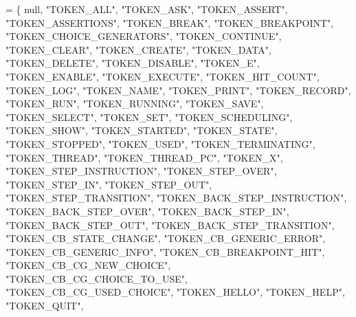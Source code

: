 \begin{DoxyCode}
= \{
    null, \textcolor{stringliteral}{"TOKEN\_ALL"}, \textcolor{stringliteral}{"TOKEN\_ASK"}, \textcolor{stringliteral}{"TOKEN\_ASSERT"}, \textcolor{stringliteral}{"TOKEN\_ASSERTIONS"}, \textcolor{stringliteral}{"TOKEN\_BREAK"}, 
    \textcolor{stringliteral}{"TOKEN\_BREAKPOINT"}, \textcolor{stringliteral}{"TOKEN\_CHOICE\_GENERATORS"}, \textcolor{stringliteral}{"TOKEN\_CONTINUE"}, \textcolor{stringliteral}{"TOKEN\_CLEAR"}, 
    \textcolor{stringliteral}{"TOKEN\_CREATE"}, \textcolor{stringliteral}{"TOKEN\_DATA"}, \textcolor{stringliteral}{"TOKEN\_DELETE"}, \textcolor{stringliteral}{"TOKEN\_DISABLE"}, \textcolor{stringliteral}{"TOKEN\_E"}, 
    \textcolor{stringliteral}{"TOKEN\_ENABLE"}, \textcolor{stringliteral}{"TOKEN\_EXECUTE"}, \textcolor{stringliteral}{"TOKEN\_HIT\_COUNT"}, \textcolor{stringliteral}{"TOKEN\_LOG"}, \textcolor{stringliteral}{"TOKEN\_NAME"}, 
    \textcolor{stringliteral}{"TOKEN\_PRINT"}, \textcolor{stringliteral}{"TOKEN\_RECORD"}, \textcolor{stringliteral}{"TOKEN\_RUN"}, \textcolor{stringliteral}{"TOKEN\_RUNNING"}, \textcolor{stringliteral}{"TOKEN\_SAVE"}, 
    \textcolor{stringliteral}{"TOKEN\_SELECT"}, \textcolor{stringliteral}{"TOKEN\_SET"}, \textcolor{stringliteral}{"TOKEN\_SCHEDULING"}, \textcolor{stringliteral}{"TOKEN\_SHOW"}, \textcolor{stringliteral}{"TOKEN\_STARTED"}, 
    \textcolor{stringliteral}{"TOKEN\_STATE"}, \textcolor{stringliteral}{"TOKEN\_STOPPED"}, \textcolor{stringliteral}{"TOKEN\_USED"}, \textcolor{stringliteral}{"TOKEN\_TERMINATING"}, \textcolor{stringliteral}{"TOKEN\_THREAD"}, 
    \textcolor{stringliteral}{"TOKEN\_THREAD\_PC"}, \textcolor{stringliteral}{"TOKEN\_X"}, \textcolor{stringliteral}{"TOKEN\_STEP\_INSTRUCTION"}, \textcolor{stringliteral}{"TOKEN\_STEP\_OVER"}, 
    \textcolor{stringliteral}{"TOKEN\_STEP\_IN"}, \textcolor{stringliteral}{"TOKEN\_STEP\_OUT"}, \textcolor{stringliteral}{"TOKEN\_STEP\_TRANSITION"}, \textcolor{stringliteral}{"TOKEN\_BACK\_STEP\_INSTRUCTION"}, 
    \textcolor{stringliteral}{"TOKEN\_BACK\_STEP\_OVER"}, \textcolor{stringliteral}{"TOKEN\_BACK\_STEP\_IN"}, \textcolor{stringliteral}{"TOKEN\_BACK\_STEP\_OUT"}, \textcolor{stringliteral}{"TOKEN\_BACK\_STEP\_TRANSITION"}, 
    \textcolor{stringliteral}{"TOKEN\_CB\_STATE\_CHANGE"}, \textcolor{stringliteral}{"TOKEN\_CB\_GENERIC\_ERROR"}, \textcolor{stringliteral}{"TOKEN\_CB\_GENERIC\_INFO"}, 
    \textcolor{stringliteral}{"TOKEN\_CB\_BREAKPOINT\_HIT"}, \textcolor{stringliteral}{"TOKEN\_CB\_CG\_NEW\_CHOICE"}, \textcolor{stringliteral}{"TOKEN\_CB\_CG\_CHOICE\_TO\_USE"}, 
    \textcolor{stringliteral}{"TOKEN\_CB\_CG\_USED\_CHOICE"}, \textcolor{stringliteral}{"TOKEN\_HELLO"}, \textcolor{stringliteral}{"TOKEN\_HELP"}, \textcolor{stringliteral}{"TOKEN\_QUIT"}, 

\end{DoxyCode}
